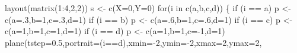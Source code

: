\documentclass[
  a4paper,
  DIV=11,
  numbers=noendperiod,
  oneside]{scrreprt}
\newenvironment{Shaded}{\begin{snugshade}}{\end{snugshade}}
\newcommand{\AttributeTok}[1]{\textcolor[rgb]{0.40,0.45,0.13}{#1}}
\newcommand{\ControlFlowTok}[1]{\textcolor[rgb]{0.00,0.23,0.31}{#1}}
\newcommand{\DecValTok}[1]{\textcolor[rgb]{0.68,0.00,0.00}{#1}}
\newcommand{\FloatTok}[1]{\textcolor[rgb]{0.68,0.00,0.00}{#1}}
\newcommand{\FunctionTok}[1]{\textcolor[rgb]{0.28,0.35,0.67}{#1}}
\newcommand{\NormalTok}[1]{\textcolor[rgb]{0.00,0.23,0.31}{#1}}
\newcommand{\OtherTok}[1]{\textcolor[rgb]{0.00,0.23,0.31}{#1}}
\newcommand{\SpecialCharTok}[1]{\textcolor[rgb]{0.37,0.37,0.37}{#1}}
\newcommand{\StringTok}[1]{\textcolor[rgb]{0.13,0.47,0.30}{#1}}
\begin{document}
\begin{Shaded}
\begin{Highlighting}[]
\FunctionTok{layout}\NormalTok{(}\FunctionTok{matrix}\NormalTok{(}\DecValTok{1}\SpecialCharTok{:}\DecValTok{4}\NormalTok{,}\DecValTok{2}\NormalTok{,}\DecValTok{2}\NormalTok{))}
\NormalTok{s }\OtherTok{\textless{}{-}} \FunctionTok{c}\NormalTok{(}\AttributeTok{X=}\DecValTok{0}\NormalTok{,}\AttributeTok{Y=}\DecValTok{0}\NormalTok{) }
\ControlFlowTok{for}\NormalTok{(i }\ControlFlowTok{in} \FunctionTok{c}\NormalTok{(}\StringTok{\textquotesingle{}a\textquotesingle{}}\NormalTok{,}\StringTok{\textquotesingle{}b\textquotesingle{}}\NormalTok{,}\StringTok{\textquotesingle{}c\textquotesingle{}}\NormalTok{,}\StringTok{\textquotesingle{}d\textquotesingle{}}\NormalTok{))}
\NormalTok{\{}
  \ControlFlowTok{if}\NormalTok{ (i }\SpecialCharTok{==} \StringTok{\textquotesingle{}a\textquotesingle{}}\NormalTok{) p }\OtherTok{\textless{}{-}} \FunctionTok{c}\NormalTok{(}\AttributeTok{a=}\NormalTok{.}\DecValTok{3}\NormalTok{,}\AttributeTok{b=}\DecValTok{1}\NormalTok{,}\AttributeTok{c=}\NormalTok{.}\DecValTok{3}\NormalTok{,}\AttributeTok{d=}\DecValTok{1}\NormalTok{)}
  \ControlFlowTok{if}\NormalTok{ (i }\SpecialCharTok{==} \StringTok{\textquotesingle{}b\textquotesingle{}}\NormalTok{) p }\OtherTok{\textless{}{-}} \FunctionTok{c}\NormalTok{(}\AttributeTok{a=}\NormalTok{.}\DecValTok{6}\NormalTok{,}\AttributeTok{b=}\DecValTok{1}\NormalTok{,}\AttributeTok{c=}\NormalTok{.}\DecValTok{6}\NormalTok{,}\AttributeTok{d=}\DecValTok{1}\NormalTok{)}
  \ControlFlowTok{if}\NormalTok{ (i }\SpecialCharTok{==} \StringTok{\textquotesingle{}c\textquotesingle{}}\NormalTok{) p }\OtherTok{\textless{}{-}} \FunctionTok{c}\NormalTok{(}\AttributeTok{a=}\DecValTok{1}\NormalTok{,}\AttributeTok{b=}\DecValTok{1}\NormalTok{,}\AttributeTok{c=}\DecValTok{1}\NormalTok{,}\AttributeTok{d=}\DecValTok{1}\NormalTok{)}
  \ControlFlowTok{if}\NormalTok{ (i }\SpecialCharTok{==} \StringTok{\textquotesingle{}d\textquotesingle{}}\NormalTok{) p }\OtherTok{\textless{}{-}} \FunctionTok{c}\NormalTok{(}\AttributeTok{a=}\DecValTok{1}\NormalTok{,}\AttributeTok{b=}\DecValTok{1}\NormalTok{,}\AttributeTok{c=}\SpecialCharTok{{-}}\DecValTok{1}\NormalTok{,}\AttributeTok{d=}\DecValTok{1}\NormalTok{)}
  \FunctionTok{plane}\NormalTok{(}\AttributeTok{tstep=}\FloatTok{0.5}\NormalTok{,}\AttributeTok{portrait=}\NormalTok{(i}\SpecialCharTok{==}\StringTok{\textquotesingle{}d\textquotesingle{}}\NormalTok{),}\AttributeTok{xmin=}\SpecialCharTok{{-}}\DecValTok{2}\NormalTok{,}\AttributeTok{ymin=}\SpecialCharTok{{-}}\DecValTok{2}\NormalTok{,}\AttributeTok{xmax=}\DecValTok{2}\NormalTok{,}\AttributeTok{ymax=}\DecValTok{2}\NormalTok{,}

\end{Highlighting}
\end{Shaded}
\end{document}
